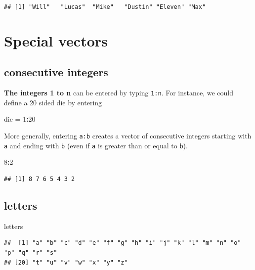 \documentclass[
]{book}
\newenvironment{Shaded}{\begin{snugshade}}{\end{snugshade}}
\newcommand{\DecValTok}[1]{\textcolor[rgb]{0.00,0.00,0.81}{#1}}
\newcommand{\NormalTok}[1]{#1}
\newcommand{\OtherTok}[1]{\textcolor[rgb]{0.56,0.35,0.01}{#1}}
\newcommand{\SpecialCharTok}[1]{\textcolor[rgb]{0.81,0.36,0.00}{\textbf{#1}}}
\theoremstyle{definition}
\theoremstyle{definition}
\theoremstyle{definition}
\theoremstyle{definition}
\theoremstyle{remark}
\begin{document}
\begin{verbatim}
## [1] "Will"   "Lucas"  "Mike"   "Dustin" "Eleven" "Max"
\end{verbatim}

\section{Special vectors}\label{special-vectors}

\subsection*{consecutive integers}\label{consecutive-integers}

\textbf{The integers 1 to n} can be entered by typing \texttt{1:n}. For instance, we could define a 20 sided die by entering

\begin{Shaded}
\begin{Highlighting}[]
\NormalTok{die }\OtherTok{=} \DecValTok{1}\SpecialCharTok{:}\DecValTok{20}
\end{Highlighting}
\end{Shaded}

More generally, entering \texttt{a:b} creates a vector of consecutive integers starting with \texttt{a} and ending with \texttt{b} (even if \texttt{a} is greater than or equal to \texttt{b}).

\begin{Shaded}
\begin{Highlighting}[]
\DecValTok{8}\SpecialCharTok{:}\DecValTok{2}
\end{Highlighting}
\end{Shaded}

\begin{verbatim}
## [1] 8 7 6 5 4 3 2
\end{verbatim}

\subsection*{letters}\label{letters}

\begin{Shaded}
\begin{Highlighting}[]
\NormalTok{letters}
\end{Highlighting}
\end{Shaded}

\begin{verbatim}
##  [1] "a" "b" "c" "d" "e" "f" "g" "h" "i" "j" "k" "l" "m" "n" "o" "p" "q" "r" "s"
## [20] "t" "u" "v" "w" "x" "y" "z"
\end{verbatim}
\end{document}
